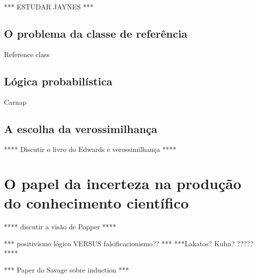 \documentclass[12pt,a4paper]{article}
\begin{document}
*** ESTUDAR JAYNES ***

\subsection{O problema da classe de referência}

Reference class

\subsection{Lógica probabilística}

Carnap
\subsection{A escolha da verossimilhança}
**** Discutir o livro do Edwards e verossimilhança ****


\section{O papel da incerteza na produção do conhecimento científico}
**** discutir a visão de Popper ****

*** positivismo lógico VERSUS falsificacionismo?? ***
***Lakatos? Kuhn? ????? ****

*** Paper do Savage sobre induction ***



\end{document}
